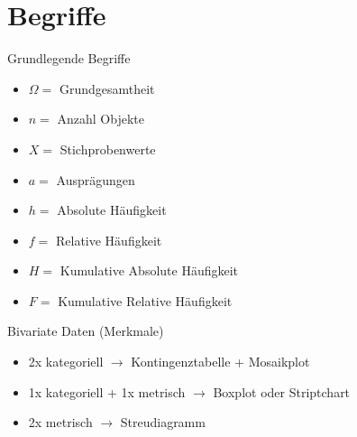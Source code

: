 \section{Begriffe}
\begin{concept}{Grundlegende Begriffe}
\begin{itemize}
  \item $\Omega=$ Grundgesamtheit
  \item $n=$ Anzahl Objekte
  \item $X=$ Stichprobenwerte
  \item $a=$ Ausprägungen
  \item $h=$ Absolute Häufigkeit
  \item $f=$ Relative Häufigkeit
  \item $H=$ Kumulative Absolute Häufigkeit
  \item $F=$ Kumulative Relative Häufigkeit
\end{itemize}
\end{concept}

\begin{definition}{Bivariate Daten (Merkmale)}
\begin{itemize}
  \item 2x kategoriell $\rightarrow$ Kontingenztabelle + Mosaikplot
  \item 1x kategoriell + 1x metrisch $\rightarrow$ Boxplot oder Striptchart
  \item 2x metrisch $\rightarrow$ Streudiagramm
\end{itemize}
\end{definition}

